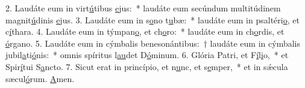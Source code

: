 2. Laudáte eum in virt\uline{ú}tibus \uline{e}jus:~* laudáte eum secúndum multitúdinem magnit\uline{ú}dinis \uline{e}jus.
3. Laudáte eum in s\uline{o}no t\uline{u}bæ:~* laudáte eum in psaltéri\uline{o}, et c\uline{í}thara.
4. Laudáte eum in týmpan\uline{o}, et ch\uline{o}ro:~* laudáte eum in ch\uline{o}rdis, et \uline{ó}rgano.
5. Laudáte eum in cýmbalis benesonántibus:~† laudáte eum in cýmbalis jubil\uline{a}ti\uline{ó}nis:~* omnis spíritus l\uline{au}det D\uline{ó}minum.
6. Glória Patri, et F\uline{í}l\uline{i}o,~* et Spir\uline{í}tui S\uline{a}ncto.
7. Sicut erat in princípio, et n\uline{u}nc, et s\uline{e}mper,~* et in sǽcula sæcul\uline{ó}rum. \uline{A}men.
